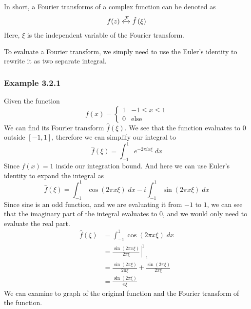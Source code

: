 \documentclass[12pt]{book}
\newcommand{\sqbkt}[1]{\left[ #1 \right]}
\newcommand{\paren}[1]{\left( #1 \right)}
\begin{document}
In short, a Fourier transforms of a complex function can be denoted as
\begin{align}
    f(z) \xleftrightarrow{\mathcal{F}} \hat{f}\paren{\xi}
\end{align}
Here, $\xi$ is the independent variable of the Fourier transform. 

To evaluate a Fourier transform, we simply need to use the Euler's identity to rewrite it as two separate integral. 

\subsubsection{Example 3.2.1}
Given the function
\[
f(x) = 
\begin{cases}
    1  &-1 \leq x \leq 1\\
    0  &\text{else}
\end{cases}
\]
We can find its Fourier transform $\hat{f}(\xi)$. We see that the function evaluates to $0$ outside $\sqbkt{-1,1}$, therefore we can simplify our integral to
\[
\hat{f}(\xi) = \int_{-1}^{1}e^{-2\pi i x \xi}\;dx
\]
Since $f(x) = 1$ inside our integration bound. And here we can use Euler's identity to expand the integral as
\[
\hat{f}(\xi) = \int_{-1}^{1} \cos\paren{2\pi x \xi}\; dx - i\int_{-1}^{1}\sin\paren{2\pi x \xi} \;dx
\]
Since sine is an odd function, and we are evaluating it from $-1$ to $1$, we can see that the imaginary part of the integral evaluates to $0$, and we would only need to evaluate the real part.
\begin{align*}
    \hat{f}(\xi)&= \int_{-1}^{1} \cos\paren{2\pi x \xi}\; dx\\
                &= \left. \frac{\sin\paren{2\pi x \xi }}{2\pi \xi} \right|_{-1}^{1}\\
                &= \frac{\sin\paren{2\pi \xi}}{2 \pi \xi} + \frac{\sin \paren{2\pi \xi}}{2\pi \xi}\\
                &= \frac{\sin\paren{2 \pi \xi}}{\pi \xi}
\end{align*}
We can examine to graph of the original function and the Fourier transform of the function. 
\end{document}
